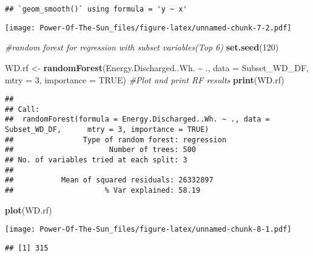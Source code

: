 \documentclass[
]{article}
\newenvironment{Shaded}{\begin{snugshade}}{\end{snugshade}}
\newcommand{\AttributeTok}[1]{\textcolor[rgb]{0.13,0.29,0.53}{#1}}
\newcommand{\CommentTok}[1]{\textcolor[rgb]{0.56,0.35,0.01}{\textit{#1}}}
\newcommand{\ConstantTok}[1]{\textcolor[rgb]{0.56,0.35,0.01}{#1}}
\newcommand{\DecValTok}[1]{\textcolor[rgb]{0.00,0.00,0.81}{#1}}
\newcommand{\FunctionTok}[1]{\textcolor[rgb]{0.13,0.29,0.53}{\textbf{#1}}}
\newcommand{\NormalTok}[1]{#1}
\newcommand{\OtherTok}[1]{\textcolor[rgb]{0.56,0.35,0.01}{#1}}
\newcommand{\SpecialCharTok}[1]{\textcolor[rgb]{0.81,0.36,0.00}{\textbf{#1}}}
\begin{document}
\begin{verbatim}
## `geom_smooth()` using formula = 'y ~ x'
\end{verbatim}

\texttt{[image: Power-Of-The-Sun\_files/figure-latex/unnamed-chunk-7-2.pdf]}

\begin{Shaded}
\begin{Highlighting}[]
\CommentTok{\#random forest for regression with subset variables(Top 6)}
\FunctionTok{set.seed}\NormalTok{(}\DecValTok{120}\NormalTok{)}

\NormalTok{WD.rf }\OtherTok{\textless{}{-}} \FunctionTok{randomForest}\NormalTok{(Energy.Discharged..Wh. }\SpecialCharTok{\textasciitilde{}}\NormalTok{ ., }
                         \AttributeTok{data =}\NormalTok{ Subset\_WD\_DF, }
                         \AttributeTok{mtry =} \DecValTok{3}\NormalTok{, }
                         \AttributeTok{importance =} \ConstantTok{TRUE}\NormalTok{) }
\CommentTok{\#Plot and print RF results }
\FunctionTok{print}\NormalTok{(WD.rf)}
\end{Highlighting}
\end{Shaded}

\begin{verbatim}
## 
## Call:
##  randomForest(formula = Energy.Discharged..Wh. ~ ., data = Subset_WD_DF,      mtry = 3, importance = TRUE) 
##                Type of random forest: regression
##                      Number of trees: 500
## No. of variables tried at each split: 3
## 
##           Mean of squared residuals: 26332897
##                     % Var explained: 58.19
\end{verbatim}

\begin{Shaded}
\begin{Highlighting}[]
\FunctionTok{plot}\NormalTok{(WD.rf)}
\end{Highlighting}
\end{Shaded}

\texttt{[image: Power-Of-The-Sun\_files/figure-latex/unnamed-chunk-8-1.pdf]}

\begin{Shaded}
\end{Shaded}

\begin{verbatim}
## [1] 315
\end{verbatim}
\end{document}
